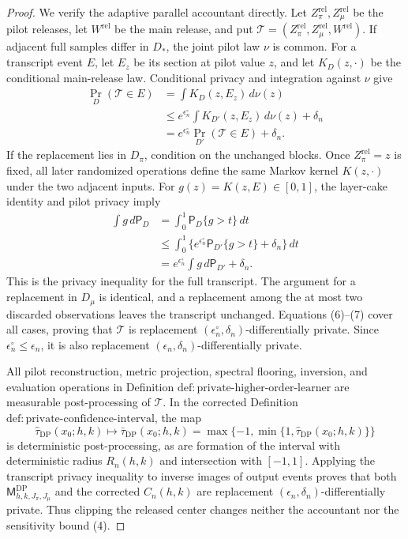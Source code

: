 \documentclass{article}
\begin{document}
\begin{proof}
We verify the adaptive parallel accountant directly.  Let \(Z_\pi^{\mathrm{rel}},Z_\mu^{\mathrm{rel}}\) be the pilot releases, let \(W^{\mathrm{rel}}\) be the main release, and put \(\mathcal T=(Z_\pi^{\mathrm{rel}},Z_\mu^{\mathrm{rel}},W^{\mathrm{rel}})\).  If adjacent full samples differ in \(D_*\), the joint pilot law \(\nu\) is common.  For a transcript event \(E\), let \(E_z\) be its section at pilot value \(z\), and let \(K_D(z,\cdot)\) be the conditional main-release law.  Conditional privacy and integration against \(\nu\) give
\[
 \begin{aligned}
 \Pr_D(\mathcal T\in E)
 &=\int K_D(z,E_z)\,d\nu(z)\\
 &\le e^{\epsilon_n^\circ}\int K_{D'}(z,E_z)\,d\nu(z)+\delta_n\\
 &=e^{\epsilon_n^\circ}\Pr_{D'}(\mathcal T\in E)+\delta_n.
 \end{aligned}
\tag{6}
\]
If the replacement lies in \(D_\pi\), condition on the unchanged blocks.  Once \(Z_\pi^{\mathrm{rel}}=z\) is fixed, all later randomized operations define the same Markov kernel \(K(z,\cdot)\) under the two adjacent inputs.  For \(g(z)=K(z,E)\in[0,1]\), the layer-cake identity and pilot privacy imply
\[
 \begin{aligned}
 \int g\,d\mathsf P_D
 &=\int_0^1\mathsf P_D\{g>t\}\,dt\\
 &\le\int_0^1\{e^{\epsilon_n^\circ}\mathsf P_{D'}\{g>t\}+\delta_n\}\,dt\\
 &=e^{\epsilon_n^\circ}\int g\,d\mathsf P_{D'}+\delta_n.
 \end{aligned}
\tag{7}
\]
This is the privacy inequality for the full transcript.  The argument for a replacement in \(D_\mu\) is identical, and a replacement among the at most two discarded observations leaves the transcript unchanged.  Equations (6)--(7) cover all cases, proving that \(\mathcal T\) is replacement \((\epsilon_n^\circ,\delta_n)\)-differentially private.  Since \(\epsilon_n^\circ\le\epsilon_n\), it is also replacement \((\epsilon_n,\delta_n)\)-differentially private.

All pilot reconstruction, metric projection, spectral flooring, inversion, and evaluation operations in Definition \(\mathrm{def{:}private\text{-}higher\text{-}order\text{-}learner}\) are measurable post-processing of \(\mathcal T\).  In the corrected Definition \(\mathrm{def{:}private\text{-}confidence\text{-}interval}\), the map
\[
 \widehat\tau_{\mathrm{DP}}(x_0;h,k)
 \longmapsto
 \bar\tau_{\mathrm{DP}}(x_0;h,k)
 =\max\{-1,\min\{1,\widehat\tau_{\mathrm{DP}}(x_0;h,k)\}\}
\]
is deterministic post-processing, as are formation of the interval with deterministic radius \(R_n(h,k)\) and intersection with \([-1,1]\).  Applying the transcript privacy inequality to inverse images of output events proves that both \(\mathsf M_{h,k,J_\pi,J_\mu}^{\mathrm{DP}}\) and the corrected \(C_n(h,k)\) are replacement \((\epsilon_n,\delta_n)\)-differentially private.  Thus clipping the released center changes neither the accountant nor the sensitivity bound (4).
\end{proof}
\end{document}
